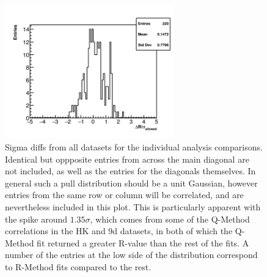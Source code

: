 \begin{figure}[]
\centering
\includegraphics[width=0.65\textwidth]{AllSigmas}
\caption{Sigma diffs from all datasets for the individual analysis comparisons. Identical but oppposite entries from across the main diagonal are not included, as well as the entries for the diagonals themselves. In general such a pull distribution should be a unit Gaussian, however entries from the same row or column will be correlated, and are nevertheless included in this plot. This is particularly apparent with the spike around $1.35\sigma$, which comes from some of the Q-Method correlations in the HK and 9d datasets, in both of which the Q-Method fit returned a greater R-value than the rest of the fits. A number of the entries at the low side of the distribution correspond to R-Method fits compared to the rest.}
\label{fig:AllSigmas}
\end{figure}




